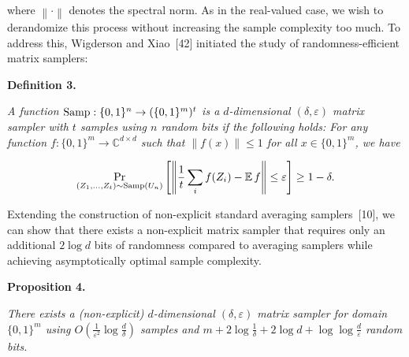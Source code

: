 \documentclass[10pt,a4paper]{article}
\begin{document}
where $\left\lVert\cdot\right\rVert$ denotes the spectral norm.
As in the real-valued case, we wish to derandomize this process without increasing the sample complexity too much.
To address this, Wigderson and Xiao [42] initiated the study of randomness-efficient matrix samplers:\par





\par\medskip\noindent\textbf{
\textbf{Definition 3}\textbf{.}
}\par



\emph{A function $\textup{{Samp}}:\{0,1\}^{n}\to(\{0,1\}^{m})^{t}$ is a $d$-dimensional $(\delta,\varepsilon)$ matrix sampler with $t$ samples using $n$ random bits if the following holds: For any function $f:\{0,1\}^{m}\to\mathbb{C}^{d\times d}$ such that $\|f(x)\|\leq 1$ for all $x\in\{0,1\}^{m}$, we have}\par


\[\begin{gathered}
\Pr_{(Z_{1},\dots,Z_{t})\sim\textup{{Samp}}(U_{n})}\left[\left\lVert\frac{1}{t}\sum_{i}f(Z_{i})-\operatorname*{\mathbb{E}}f\right\rVert\leq\varepsilon\right]\geq 1-\delta.
\end{gathered}\]






Extending the construction of non-explicit standard averaging samplers [10], we can show that there exists a non-explicit matrix sampler that requires only an additional $2\log d$ bits of randomness compared to averaging samplers while achieving asymptotically optimal sample complexity.\par





\par\medskip\noindent\textbf{
\textbf{Proposition 4}\textbf{.}
}\par



\emph{There exists a (non-explicit) $d$-dimensional $(\delta,\varepsilon)$ matrix sampler for domain $\{0,1\}^{m}$ using $O(\frac{1}{\varepsilon^{2}}\log\frac{d}{\delta})$ samples and $m+2\log\frac{1}{\delta}+2\log d+\log\log\frac{d}{\varepsilon}$ random bits.}\par
\end{document}
